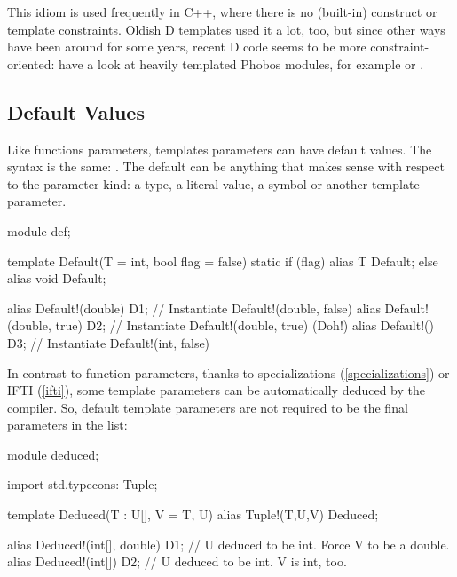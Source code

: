 This idiom is used frequently in C++, where there is no (built-in)  construct or template constraints. Oldish D templates used it a lot, too, but since other ways have been around for some years, recent D code seems to be more constraint-oriented: have a look at heavily templated Phobos modules, for example  or .


\subsection{Default Values}\label{default}

Like functions parameters, templates parameters can have default values. The syntax is the same: . The default can be anything that makes sense with respect to the parameter kind: a type, a literal value, a symbol or another template parameter.

\begin{dcode}
module def;

template Default(T = int, bool flag = false)
{
    static if (flag)
        alias T Default;
    else
        alias void Default;
}

alias Default!(double) D1;       // Instantiate Default!(double, false)
alias Default!(double, true) D2; // Instantiate Default!(double, true) (Doh!)
alias Default!() D3;             // Instantiate Default!(int, false)
\end{dcode}

In contrast to function parameters, thanks to specializations (\ref{specializations}) or IFTI (\ref{ifti}), some template parameters can be automatically deduced by the compiler. So, default template parameters are not required to be the final parameters in the list:

\begin{dcode}
module deduced;

import std.typecons: Tuple;

template Deduced(T : U[], V = T, U)
{
    alias Tuple!(T,U,V) Deduced;
}

alias Deduced!(int[], double) D1; // U deduced to be int. Force V to be a double.
alias Deduced!(int[]) D2; // U deduced to be int. V is int, too.
\end{dcode}



